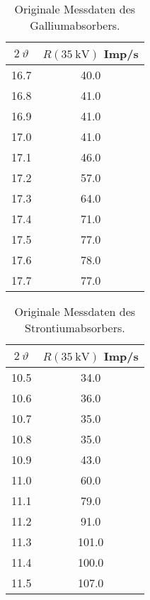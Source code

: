 \begin{table}[H]
    \caption{Originale Messdaten des Galliumabsorbers.}
    \centering
    \label{tab:origDaten3}
    \begin{tabular}{c c}
        \toprule
        $2~\vartheta$ & $R(\SI{35}{\kilo\volt})$ Imp/s \\
        \midrule
        16.7  &  40.0  \\
        16.8  &  41.0  \\
        16.9  &  41.0  \\
        17.0  &  41.0  \\
        17.1  &  46.0  \\
        17.2  &  57.0  \\
        17.3  &  64.0  \\
        17.4  &  71.0  \\
        17.5  &  77.0  \\
        17.6  &  78.0  \\
        17.7  &  77.0  \\
        \bottomrule
    \end{tabular}
\end{table}

\begin{table}[H]
    \caption{Originale Messdaten des Strontiumabsorbers.}
    \centering
    \label{tab:origDaten4}
    \begin{tabular}{c c}
        \toprule
        $2~\vartheta$ & $R(\SI{35}{\kilo\volt})$ Imp/s \\
        \midrule
        10.5  &  34.0  \\
        10.6  &  36.0  \\
        10.7  &  35.0  \\
        10.8  &  35.0  \\
        10.9  &  43.0  \\
        11.0  &  60.0  \\
        11.1  &  79.0  \\
        11.2  &  91.0  \\
        11.3  &  101.0  \\
        11.4  &  100.0  \\
        11.5  &  107.0  \\
    \end{tabular}
\end{table}

